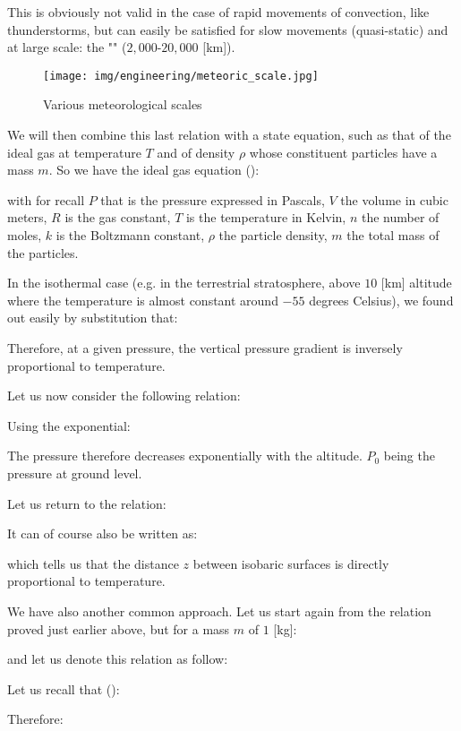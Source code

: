 	This is obviously not valid in the case of rapid movements of convection, like thunderstorms, but can easily be satisfied for slow movements (quasi-static) and at large scale: the "" ($2,000$-$20,000$ [km]).
	\begin{figure}[H]
		\begin{center}
			\texttt{[image: img/engineering/meteoric\_scale.jpg]}
		\end{center}	
		\caption{Various meteorological scales}
	\end{figure}
	We will then combine this last relation with a state equation, such as that of the ideal gas at temperature $T$ and of density $\rho$ whose constituent particles have a mass $m$. So we have the ideal gas equation ():
	
	with for recall $P$ that is the pressure expressed in Pascals, $V$ the volume in cubic meters, $R$ is the gas constant, $T$ is the temperature in Kelvin, $n$ the number of moles, $k$ is the Boltzmann constant, $\rho$ the particle density, $m$ the total mass of the particles.
	
	In the isothermal case (e.g. in the terrestrial stratosphere, above $10$ [km] altitude where the temperature is almost constant around $-55$ degrees Celsius), we found out easily by substitution that:
	
	Therefore, at a given pressure, the vertical pressure gradient is inversely proportional to temperature.

	Let us now consider the following relation:
	
	Using the exponential:
	
	The pressure therefore decreases exponentially with the altitude. $P_0$ being the pressure at ground level.

	Let us return to the relation:
	
	It can of course also be written as:
	
	which tells us that the distance $z$ between isobaric surfaces is directly proportional to temperature.

	We have also another common approach. Let us start again from the relation proved just earlier above, but for a mass $m$ of $1$ [kg]:
	
	and let us denote this relation as follow:
	
	Let us recall that ():
	
	Therefore:	
	
